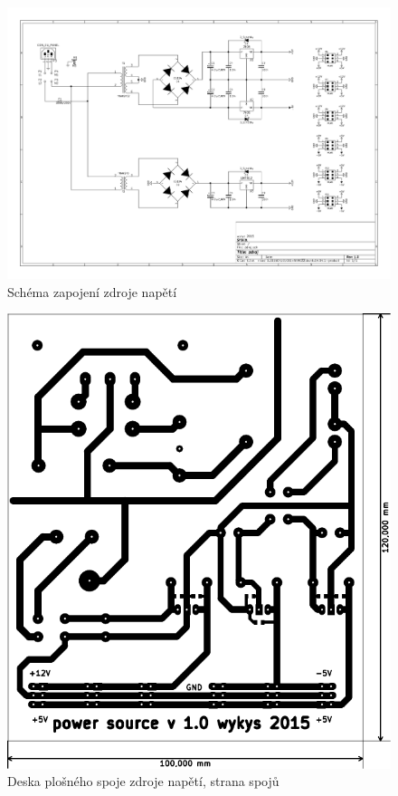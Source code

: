 \begin{landscape}
	\begin{figure}[h]
		\centering 	
		\includegraphics[height=\textwidth]{img/zdroj/sch.pdf}
		\caption{Schéma zapojení zdroje napětí}	
	\end{figure}
\end{landscape}
%

\begin{figure}[H]
	\centering
	\includegraphics[width=170mm]{img/zdroj/cu_b.pdf}
	\caption{Deska plošného spoje zdroje napětí, strana spojů}    		
\end{figure}


